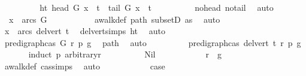 \begin{isabellebody}
\ \ \ \ \ \ \isamarkupfalse%
\ \isamarkupfalse%
\ ht{\isacharcolon}{\kern0pt}\ {\isachardoublequoteopen}head\ G\ x\ {\isasymnoteq}\ t\ {\isasymand}\ tail\ G\ x\ {\isasymnoteq}\ t{\isachardoublequoteclose}\isanewline
\ \ \ \ \ \ \ \ \isamarkupfalse%
\ no{\isacharunderscore}{\kern0pt}head\ no{\isacharunderscore}{\kern0pt}tail\ \isamarkupfalse%
\ auto\isanewline
\ \ \ \ \ \ \isamarkupfalse%
\ {\isachardoublequoteopen}\ x\ {\isasymin}\ arcs\ G{\isachardoublequoteclose}\ \isanewline
\ \ \ \ \ \ \ \ \isamarkupfalse%
\ awalk{\isacharunderscore}{\kern0pt}def\ path\ subsetD\ as{}\ \isamarkupfalse%
\ auto\isanewline
\ \ \ \ \ \ \isamarkupfalse%
\ \isamarkupfalse%
\ {\isachardoublequoteopen}x\ {\isasymin}\ arcs\ {\isacharparenleft}{\kern0pt}del{\isacharunderscore}{\kern0pt}vert\ t{\isacharparenright}{\kern0pt}{\isachardoublequoteclose}\ \isamarkupfalse%
\ del{\isacharunderscore}{\kern0pt}vert{\isacharunderscore}{\kern0pt}simps{\isacharparenleft}{\kern0pt}{}{\isacharparenright}{\kern0pt}\ ht\ \isamarkupfalse%
\ auto\ \ \ \isanewline
\ \ \ \ \isamarkupfalse%
\isanewline
\ \ \ \ \ \ \isamarkupfalse%
\ {\isachardoublequoteopen}pre{\isacharunderscore}{\kern0pt}digraph{\isachardot}{\kern0pt}cas\ G\ r\ p\ g{\isachardoublequoteclose}\ \isamarkupfalse%
\ path\ \isamarkupfalse%
\ auto\isanewline
\ \ \ \ \ \ \isamarkupfalse%
\ \isamarkupfalse%
\ {\isachardoublequoteopen}pre{\isacharunderscore}{\kern0pt}digraph{\isachardot}{\kern0pt}cas\ {\isacharparenleft}{\kern0pt}del{\isacharunderscore}{\kern0pt}vert\ t{\isacharparenright}{\kern0pt}\ r\ p\ g{\isachardoublequoteclose}\isanewline
\ \ \ \ \ \ \isamarkupfalse%
{\isacharparenleft}{\kern0pt}induct\ p\ arbitrary{\isacharcolon}{\kern0pt}r{\isacharparenright}{\kern0pt}\isanewline
\ \ \ \ \ \ \ \ \isamarkupfalse%
\ Nil\isanewline
\ \ \ \ \ \ \ \ \isamarkupfalse%
\ \isamarkupfalse%
\ {\isachardoublequoteopen}r\ {\isacharequal}{\kern0pt}\ g{\isachardoublequoteclose}\ \isamarkupfalse%
\ awalk{\isacharunderscore}{\kern0pt}def\ cas{\isachardot}{\kern0pt}simps\ \isamarkupfalse%
\ auto\isanewline
\ \ \ \ \ \ \ \ \isamarkupfalse%
\ \isamarkupfalse%
\ {\isacharquery}{\kern0pt}case\ \isamarkupfalse%

\end{isabellebody}
